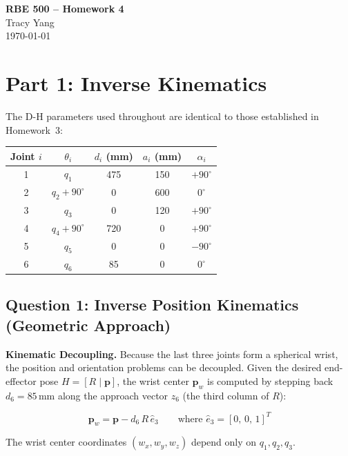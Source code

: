 \documentclass[12pt]{article}
\begin{document}
\begin{center}
    {\LARGE \textbf{RBE 500 -- Homework 4}} \\[6pt]
    {\large Tracy Yang} \\[4pt]
    {\large \today}
\end{center}

\section{Part 1: Inverse Kinematics}

The D-H parameters used throughout are identical to those established
in Homework~3:

\begin{center}
\renewcommand{\arraystretch}{1.3}
\begin{tabular}{ccccc}
\toprule
Joint $i$ & $\theta_i$ & $d_i$ (mm) & $a_i$ (mm) & $\alpha_i$ \\
\midrule
1 & $q_1$           & 475 & 150 & $+90^\circ$ \\
2 & $q_2 + 90^\circ$&   0 & 600 & $0^\circ$   \\
3 & $q_3$           &   0 & 120 & $+90^\circ$ \\
4 & $q_4 + 90^\circ$& 720 &   0 & $+90^\circ$ \\
5 & $q_5$           &   0 &   0 & $-90^\circ$ \\
6 & $q_6$           &  85 &   0 & $0^\circ$   \\
\bottomrule
\end{tabular}
\end{center}

\subsection{Question 1: Inverse Position Kinematics (Geometric Approach)}

\textbf{Kinematic Decoupling.}
Because the last three joints form a spherical wrist, the position
and orientation problems can be decoupled. Given the desired
end-effector pose $H = [R \mid \mathbf{p}]$, the wrist center
$\mathbf{p}_w$ is computed by stepping back $d_6 = 85$\,mm along
the approach vector $\hat{z}_6$ (the third column of $R$):

\[
\mathbf{p}_w = \mathbf{p} - d_6\,R\,\hat{e}_3
\qquad \text{where } \hat{e}_3 = [0,\,0,\,1]^T
\]

The wrist center coordinates $(w_x, w_y, w_z)$ depend only on
$q_1, q_2, q_3$.
\end{document}
